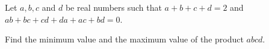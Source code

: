 Let $a, b,c$ and $d$ be real numbers such that $a + b + c + d = 2$ and $ab + bc + cd + da + ac + bd = 0$.

Find the minimum value and the maximum value of the product $abcd$.